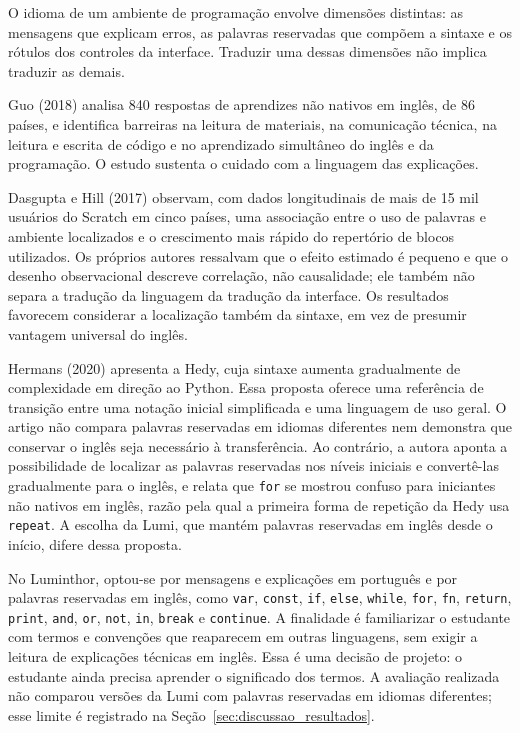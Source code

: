 \documentclass[
    12pt
    ,oneside
    ,a4paper
    ,chapter=TITLE
    ,section=TITLE
    ,sumario=abnt-6027-2012]{abntex2}
\begin{document}
O idioma de um ambiente de programação envolve dimensões distintas: as mensagens
que explicam erros, as palavras reservadas que compõem a sintaxe e os rótulos dos
controles da interface. Traduzir uma dessas dimensões não implica traduzir as demais.

Guo (2018) analisa 840 respostas de aprendizes não nativos em inglês, de 86 países,
e identifica barreiras na leitura de materiais, na comunicação técnica, na leitura e
escrita de código e no aprendizado simultâneo do inglês e da programação. O estudo sustenta o cuidado com a linguagem das explicações.

Dasgupta e Hill (2017) observam, com dados longitudinais de mais de 15 mil usuários
do Scratch em cinco países, uma associação entre o uso de palavras e ambiente
localizados e o crescimento mais rápido do repertório de blocos utilizados. Os
próprios autores ressalvam que o efeito estimado é pequeno e que o desenho
observacional descreve correlação, não causalidade; ele também não separa a tradução
da linguagem da tradução da interface. Os resultados favorecem considerar a localização também da
sintaxe, em vez de presumir vantagem universal do inglês.

Hermans (2020) apresenta a Hedy, cuja sintaxe aumenta gradualmente de complexidade
em direção ao Python. Essa proposta oferece uma referência de transição entre uma
notação inicial simplificada e uma linguagem de uso geral. O artigo não compara
palavras reservadas em idiomas diferentes nem demonstra que conservar o inglês seja
necessário à transferência. Ao contrário, a autora aponta a possibilidade de localizar
as palavras reservadas nos níveis iniciais e convertê-las gradualmente para o inglês,
e relata que \texttt{for} se mostrou confuso para iniciantes não nativos em inglês,
razão pela qual a primeira forma de repetição da Hedy usa \texttt{repeat}. A escolha da Lumi, que mantém
palavras reservadas em inglês desde o início, difere dessa proposta.

No Luminthor, optou-se por mensagens e explicações em português e por palavras
reservadas em inglês, como \texttt{var}, \texttt{const}, \texttt{if}, \texttt{else},
\texttt{while}, \texttt{for}, \texttt{fn}, \texttt{return}, \texttt{print},
\texttt{and}, \texttt{or}, \texttt{not}, \texttt{in}, \texttt{break} e
\texttt{continue}. A finalidade é familiarizar o estudante com termos e convenções
que reaparecem em outras linguagens, sem exigir a leitura de explicações técnicas
em inglês. Essa é uma decisão de projeto: o estudante ainda precisa aprender o significado dos termos.
A avaliação realizada não comparou versões da Lumi com palavras reservadas em
idiomas diferentes; esse limite é registrado na Seção~\ref{sec:discussao_resultados}.
\end{document}

